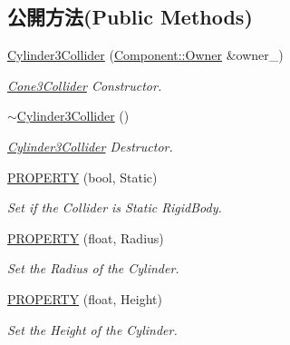 \subsection*{公開方法(Public Methods)}
\begin{DoxyCompactItemize}
\item 
\hyperlink{class_magnum_1_1_cylinder3_collider_afbc1ecf758fb81a7c48546142da25e5e}{Cylinder3\+Collider} (\hyperlink{class_magnum_1_1_component_1_1_owner}{Component\+::\+Owner} \&owner\+\_\+)
\begin{DoxyCompactList}\small\item\em \hyperlink{class_magnum_1_1_cone3_collider}{Cone3\+Collider} Constructor. \end{DoxyCompactList}\item 
\hyperlink{class_magnum_1_1_cylinder3_collider_ab4873181f3b2a607df54ea51303143bc}{$\sim$\+Cylinder3\+Collider} ()
\begin{DoxyCompactList}\small\item\em \hyperlink{class_magnum_1_1_cylinder3_collider}{Cylinder3\+Collider} Destructor. \end{DoxyCompactList}\item 
\hyperlink{class_magnum_1_1_cylinder3_collider_a318952e603218c226e6dadbcc9214f05}{P\+R\+O\+P\+E\+R\+TY} (bool, Static)
\begin{DoxyCompactList}\small\item\em Set if the Collider is Static Rigid\+Body. \end{DoxyCompactList}\item 
\hyperlink{class_magnum_1_1_cylinder3_collider_ae9ab686b963e20f3e4b1938201e55172}{P\+R\+O\+P\+E\+R\+TY} (float, Radius)
\begin{DoxyCompactList}\small\item\em Set the Radius of the Cylinder. \end{DoxyCompactList}\item 
\hyperlink{class_magnum_1_1_cylinder3_collider_aefa7d32f95f39b999e87735f8bf3dfc7}{P\+R\+O\+P\+E\+R\+TY} (float, Height)
\begin{DoxyCompactList}\small\item\em Set the Height of the Cylinder. \end{DoxyCompactList}\end{DoxyCompactItemize}
